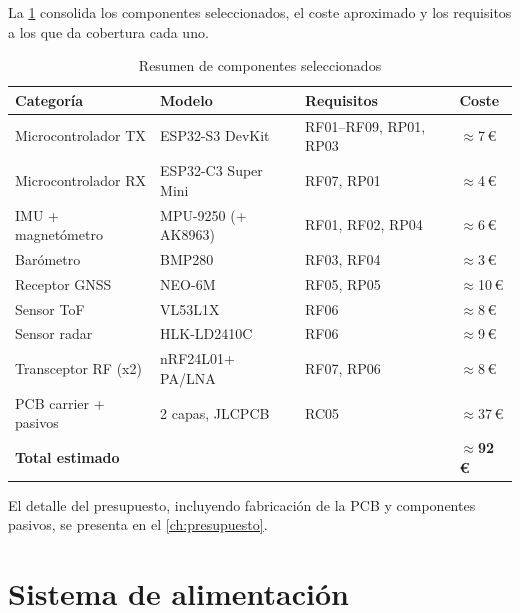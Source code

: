 La \cref{tab:bom_resumen} consolida los componentes seleccionados, el
coste aproximado y los requisitos a los que da cobertura cada uno.

\begin{table}[H]
    \centering
    \caption{Resumen de componentes seleccionados}
    \label{tab:bom_resumen}
    \footnotesize
    \begin{tabularx}{\linewidth}{l X l l}
        \toprule
        \textbf{Categoría} & \textbf{Modelo} & \textbf{Requisitos} & \textbf{Coste} \\
        \midrule
        Microcontrolador TX            & ESP32-S3 DevKit       & RF01--RF09, RP01, RP03 & $\approx$7\,\euro{} \\
        Microcontrolador RX            & ESP32-C3 Super Mini   & RF07, RP01             & $\approx$4\,\euro{} \\
        IMU + magnetómetro             & MPU-9250 (+ AK8963)   & RF01, RF02, RP04       & $\approx$6\,\euro{} \\
        Barómetro                      & BMP280                & RF03, RF04             & $\approx$3\,\euro{} \\
        Receptor GNSS                  & NEO-6M                & RF05, RP05             & $\approx$10\,\euro{} \\
        Sensor ToF                     & VL53L1X               & RF06                   & $\approx$8\,\euro{} \\
        Sensor radar                   & HLK-LD2410C           & RF06                   & $\approx$9\,\euro{} \\
        Transceptor RF (x2)            & nRF24L01+ PA/LNA      & RF07, RP06             & $\approx$8\,\euro{} \\
        PCB carrier + pasivos          & 2 capas, JLCPCB       & RC05                   & $\approx$37\,\euro{} \\
        \midrule
        \textbf{Total estimado}        &                       &                        & \textbf{$\approx$92\,\euro{}} \\
        \bottomrule
    \end{tabularx}
\end{table}

El detalle del presupuesto, incluyendo fabricación de la PCB y componentes
pasivos, se presenta en el \cref{ch:presupuesto}. 



\section{Sistema de alimentación}
\label{sec:alimentacion}

